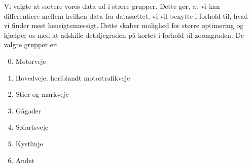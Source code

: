 Vi valgte at sortere vores data ud i større grupper. Dette gør, at vi kan differentiere mellem hvilken data fra datasættet, vi vil benytte i forhold til, hvad vi finder mest hensigtsmæssigt. Dette skaber mulighed for større optimering og hjælper os med at adskille detaljegraden på kortet i forhold til zoomgraden. De valgte grupper er:
\begin{enumerate}
\setcounter{enumi}{-1}
	\item Motorveje
	\item Hovedveje, heriblandt motortrafikveje
	\item Stier og markveje
	\item Gågader
	\item Søfartsveje
	\item Kystlinje
	\item Andet
\end{enumerate}